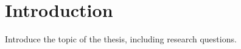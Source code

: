 \chapter{Introduction}\label{ch:introduction}

Introduce the topic of the thesis, including research questions.